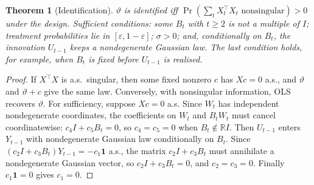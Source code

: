 \documentclass[11pt]{article}
\newtheorem{theorem}{Theorem}
\theoremstyle{definition}
\begin{document}
\begin{theorem}[Identification]\label{thm:id}
$\vartheta$ is identified iff $\Pr(\sum_tX_t^\top X_t\text{ nonsingular})>0$ under the design. Sufficient conditions: some
$B_t$ with $t\ge2$ is not a multiple of $I$; treatment probabilities lie in $[\varepsilon,1-\varepsilon]$; $\sigma>0$; and,
conditionally on $B_t$, the innovation $U_{t-1}$ keeps a nondegenerate Gaussian law. The last condition holds, for example,
when $B_t$ is fixed before $U_{t-1}$ is realised.
\end{theorem}
\begin{proof}
If $X^\top X$ is a.s.\ singular, then some fixed nonzero $c$ has $Xc=0$ a.s., and $\vartheta$ and $\vartheta+c$ give the same
law. Conversely, with nonsingular information, OLS recovers $\vartheta$. For sufficiency, suppose $Xc=0$ a.s. Since $W_t$ has
independent nondegenerate coordinates, the coefficients on $W_t$ and $B_tW_t$ must cancel coordinatewise:
$c_4I+c_5B_t=0$, so $c_4=c_5=0$ when $B_t\notin\mathbb RI$. Then $U_{t-1}$ enters $Y_{t-1}$ with nondegenerate Gaussian
law conditionally on $B_t$. Since $(c_2I+c_3B_t)Y_{t-1}=-c_1\mathbf 1$ a.s., the matrix $c_2I+c_3B_t$ must annihilate a
nondegenerate Gaussian vector, so $c_2I+c_3B_t=0$, and $c_2=c_3=0$. Finally $c_1\mathbf 1=0$ gives $c_1=0$.
\end{proof}
\end{document}
